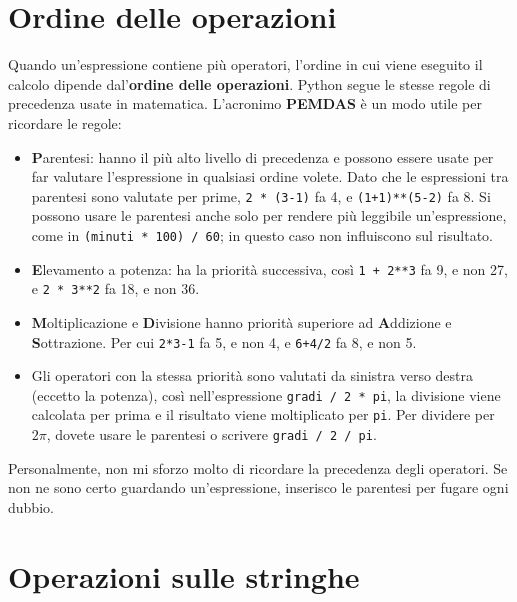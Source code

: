 \documentclass[10pt]{book}
\begin{document}
\section{Ordine delle operazioni}

Quando un'espressione contiene più operatori, l'ordine in cui viene eseguito il calcolo dipende dal'{\bf ordine delle operazioni}. Python segue le stesse regole di precedenza usate in matematica. L'acronimo {\bf PEMDAS} è un modo utile per ricordare le regole:

\begin{itemize}

\item {\bf P}arentesi: hanno il più alto livello di precedenza e possono essere usate per far valutare l'espressione in qualsiasi ordine volete.    Dato che le espressioni tra parentesi sono valutate per prime, {\tt 2 * (3-1)} fa 4, e {\tt (1+1)**(5-2)} fa 8. Si possono usare le parentesi anche solo per rendere più leggibile un'espressione, come in {\tt (minuti * 100) / 60}; in questo caso non influiscono sul risultato.

\item {\bf E}levamento a potenza: ha la priorità successiva, così
{\tt 1 + 2**3} fa 9, e non 27, e {\tt 2 * 3**2} fa 18, e non 36.

\item {\bf M}oltiplicazione e {\bf D}ivisione hanno priorità superiore ad {\bf A}ddizione e {\bf S}ottrazione. Per cui {\tt 2*3-1} fa 5, e non 4, e {\tt 6+4/2} fa 8, e non 5.

\item Gli operatori con la stessa priorità sono valutati da sinistra verso destra (eccetto la potenza), così nell'espressione {\tt gradi / 2 * pi}, la divisione viene calcolata per prima e il risultato viene moltiplicato per {\tt pi}.  Per dividere per $2 \pi$, dovete usare le parentesi o scrivere {\tt gradi / 2 / pi}.

\end{itemize}

Personalmente, non mi sforzo molto di ricordare la precedenza degli operatori. Se non ne sono certo guardando un'espressione, inserisco le parentesi per fugare ogni dubbio.

\section{Operazioni sulle stringhe}
\end{document}
